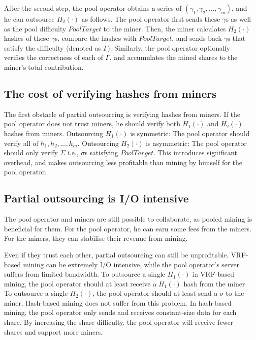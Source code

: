 After the second step, the pool operator obtains a series of $(\gamma_1, \gamma_2, \dots, \gamma_m)$, and he can outsource $H_2(\cdot)$ as follows.
The pool operator first sends these $\gamma$s as well as the pool difficulty $PoolTarget$ to the miner.
Then, the miner calculates $H_2(\cdot)$ hashes of these $\gamma$s, compare the hashes with $PoolTarget$, and sends back $\gamma$s that satisfy the difficulty (denoted as $\Gamma$).
Similarly, the pool operator optionally verifies the correctness of each of $\Gamma$, and accumulates the mined shares to the miner's total contribution.


\subsection{The cost of verifying hashes from miners}

The first obstacle of partial outsourcing is verifying hashes from miners.
If the pool operator does not trust miners, he should verify both $H_1(\cdot)$ and $H_2(\cdot)$ hashes from miners.
Outsourcing $H_1(\cdot)$ is symmetric: The pool operator should verify all of $h_1, h_2, \dots, h_m$.
Outsourcing $H_2(\cdot)$ is asymmetric: The pool operator should only verify $\Sigma$ i.e., $\sigma$s satisfying $PoolTarget$.
This introduces significant overhead, and makes outsourcing less profitable than mining by himself for the pool operator.


\subsection{Partial outsourcing is I/O intensive}

The pool operator and miners are still possible to collaborate, as pooled mining is beneficial for them.
For the pool operator, he can earn some fees from the miners.
For the miners, they can stabilise their revenue from mining.

Even if they trust each other, partial outsourcing can still be unprofitable.
VRF-based mining can be extremely I/O intensive, while the pool operator's server suffers from limited bandwidth.
To outsource a single $H_1(\cdot)$ in VRF-based mining, the pool operator should at least receive a $H_1(\cdot)$ hash from the miner
To outsource a single $H_2(\cdot)$, the pool operator should at least send a $\sigma$ to the miner.
Hash-based mining does not suffer from this problem.
In hash-based mining, the pool operator only sends and receives constant-size data for each share.
By increasing the share difficulty, the pool operator will receive fewer shares and support more miners.

